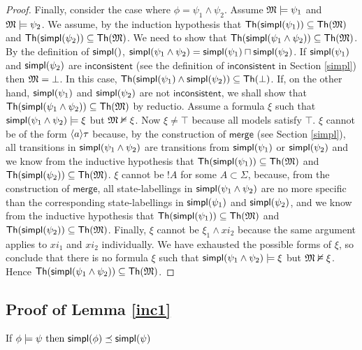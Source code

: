 \begin{proof}
Finally, consider the case where $\phi = \psi_1 \land \psi_2$.
Assume $\frak{M} \models \psi_1$ and $\frak{M} \models \psi_2$.
We assume, by the induction hypothesis that $\mathsf{Th}(\mathsf{simpl}(\psi_1)) \subseteq \mathsf{Th}(\frak{M})$ and $\mathsf{Th}(\mathsf{simpl}(\psi_2)) \subseteq \mathsf{Th}(\frak{M})$.
We need to show that $\mathsf{Th}(\mathsf{simpl}(\psi_1\land \psi_2)) \subseteq \mathsf{Th}(\frak{M})$.
By the definition of $\mathsf{simpl}()$, $\mathsf{simpl}(\psi_1 \land \psi_2) = \mathsf{simpl}(\psi_1) \sqcap \mathsf{simpl}(\psi_2)$.
If $\mathsf{simpl}(\psi_1)$ and $\mathsf{simpl}(\psi_2)$ are $\mathsf{inconsistent}$ (see the definition of $\mathsf{inconsistent}$ in Section \ref{simpl}) then $\frak{M} = \bot$. In this case, $\mathsf{Th}(\mathsf{simpl}(\psi_1) \land \mathsf{simpl}(\psi_2)) \subseteq \mathsf{Th}(\bot)$.
If, on the other hand, $\mathsf{simpl}(\psi_1)$ and $\mathsf{simpl}(\psi_2)$ are not $\mathsf{inconsistent}$, we shall show that $\mathsf{Th}(\mathsf{simpl}(\psi_1 \land \psi_2)) \subseteq \mathsf{Th}(\frak{M})$ by reductio.
Assume a formula $\xi$ such that $\mathsf{simpl}(\psi_1 \land \psi_2) \models \xi$ but $\frak{M} \nvDash \xi$.
Now $\xi \neq \top$ because all models satisfy $\top$.
$\xi$ cannot be of the form $\langle a \rangle \tau$ because, by the construction of $\mathsf{merge}$ (see Section \ref{simpl}), all transitions in $\mathsf{simpl}(\psi_1 \land \psi_2)$ are transitions from $\mathsf{simpl}(\psi_1)$ or $\mathsf{simpl}(\psi_2)$ and we know from the inductive hypothesis that $\mathsf{Th}(\mathsf{simpl}(\psi_1)) \subseteq \mathsf{Th}(\frak{M})$ and $\mathsf{Th}(\mathsf{simpl}(\psi_2)) \subseteq \mathsf{Th}(\frak{M})$.
$\xi$ cannot be $!A$ for some $A \subset \Sigma$, because, from the construction of $\mathsf{merge}$, all state-labellings in $\mathsf{simpl}(\psi_1 \land \psi_2)$ are no more specific than the corresponding state-labellings in $\mathsf{simpl}(\psi_1)$ and $\mathsf{simpl}(\psi_2)$, and we know from the inductive hypothesis that $\mathsf{Th}(\mathsf{simpl}(\psi_1)) \subseteq \mathsf{Th}(\frak{M})$ and $\mathsf{Th}(\mathsf{simpl}(\psi_2)) \subseteq \mathsf{Th}(\frak{M})$.
Finally, $\xi$ cannot be $\xi_1 \land xi_2$ because the same argument applies to $xi_1$ and $xi_2$ individually.
We have exhausted the possible forms of $\xi$, so conclude that there is no formula $\xi$ such that $\mathsf{simpl}(\psi_1 \land \psi_2) \models \xi$ but $\frak{M} \nvDash \xi$.
Hence $\mathsf{Th}(\mathsf{simpl}(\psi_1\land \psi_2)) \subseteq \mathsf{Th}(\frak{M})$.
\end{proof}


\subsection{Proof of Lemma \ref{inc1}}
If $\phi \models \psi \mbox{ then } \mathsf{simpl}(\phi) \preceq \mathsf{simpl}(\psi)$

